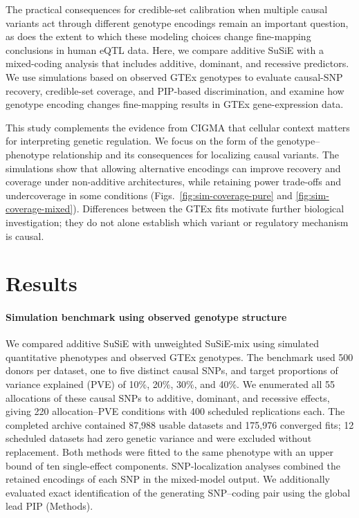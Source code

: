 \documentclass[12pt]{article}
\begin{document}
The practical consequences for credible-set calibration when multiple
causal variants act through different genotype encodings remain an
important question, as does the extent to which these modeling choices
change fine-mapping conclusions in human eQTL data. Here, we compare
additive SuSiE with a mixed-coding analysis that includes additive,
dominant, and recessive predictors. We use simulations based on observed
GTEx genotypes to evaluate causal-SNP recovery, credible-set coverage,
and PIP-based discrimination, and examine how genotype encoding changes
fine-mapping results in GTEx gene-expression data.

This study complements the evidence from CIGMA that cellular context
matters for interpreting genetic regulation. We focus on the form of
the genotype--phenotype relationship and its consequences for localizing
causal variants. The simulations show that allowing alternative
encodings can improve recovery and coverage under non-additive
architectures, while retaining power trade-offs and undercoverage in
some conditions (Figs.~\ref{fig:sim-coverage-pure} and
\ref{fig:sim-coverage-mixed}). Differences between the GTEx fits motivate
further biological investigation; they do not alone establish which
variant or regulatory mechanism is causal.

\section{Results}

\paragraph{Simulation benchmark using observed genotype structure}

We compared additive SuSiE with unweighted SuSiE-mix using simulated
quantitative phenotypes and observed GTEx genotypes. The benchmark used
500 donors per dataset, one to five distinct causal SNPs, and target
proportions of variance explained (PVE) of 10\%, 20\%, 30\%, and 40\%.
We enumerated all 55 allocations of these causal SNPs to additive,
dominant, and recessive effects, giving 220 allocation--PVE conditions
with 400 scheduled replications each. The completed archive contained
87,988 usable datasets and 175,976 converged fits; 12 scheduled datasets
had zero genetic variance and were excluded without replacement.
Both methods were fitted to the same phenotype with an upper bound of
ten single-effect components.
SNP-localization analyses combined the retained encodings of each SNP
in the mixed-model output. We additionally evaluated exact identification
of the generating SNP--coding pair using the global lead PIP (Methods).
\end{document}

